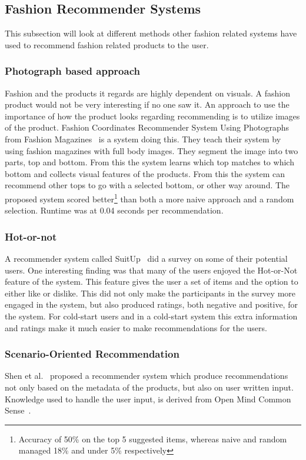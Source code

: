 
\subsection{Fashion Recommender Systems}
    This subsection will look at different methods other fashion related systems have used to recommend fashion related products to the user.

\subsubsection{Photograph based approach}
    Fashion and the products it regards are highly dependent on visuals.  A fashion
    product would not be very interesting if no one saw it.  An approach to use the
    importance of how the product looks regarding recommending is to utilize images
    of the product.  Fashion Coordinates Recommender System Using Photographs from
    Fashion Magazines~\cite{Iwata:2011} is a system doing this.  They teach their
    system by using fashion magazines with full body images.  They segment the
    image into two parts, top and bottom.  From this the system learns which top
    matches to which bottom and collects visual features of the products.  From
    this the system can recommend other tops to go with a selected bottom, or other
    way around.  The proposed system scored better\footnote{Accuracy of 50\% on the
    top 5 suggested items, whereas naive and random managed 18\% and under 5\%
    respectively} than both a more naive approach and a random selection.  Runtime
    was at 0.04 seconds per recommendation.

\subsubsection{Hot-or-not}
    A recommender system called SuitUp~\cite{SuitUp} did a survey on some of their potential users.
    One interesting finding was that many of the users enjoyed the Hot-or-Not feature of the system.
    This feature gives the user a set of items and the option to either like or dislike.
    This did not only make the participants in the survey more engaged in the system, but also produced ratings, both negative and positive, for the system.
    For cold-start users and in a cold-start system this extra information and ratings make it much easier to make recommendations for the users.

\subsubsection{Scenario-Oriented Recommendation}
    Shen et al.~\cite{Shen:2007:AIG:1216295.1216368} proposed a recommender system which produce recommendations not only based on the metadata of the products, but also on user written input.
    Knowledge used to handle the user input, is derived from Open Mind Common Sense~\cite{Singh02openmind}.

